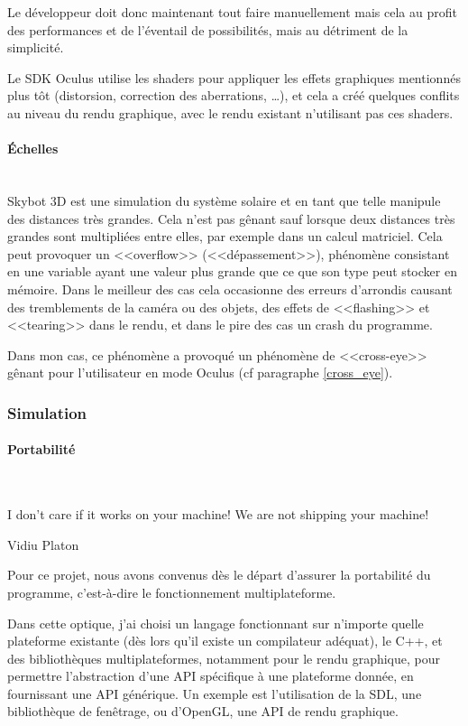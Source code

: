 \documentclass[a4paper,french,12pt]{article}
\begin{document}
		Le développeur doit donc maintenant tout faire manuellement mais cela au profit des performances et de l'éventail
		de possibilités, mais au détriment de la simplicité.
		
		Le SDK Oculus utilise les shaders pour appliquer les effets graphiques mentionnés plus tôt (distorsion, 
		correction des aberrations, \ldots), et cela a créé quelques conflits au niveau du rendu graphique, 
		avec le rendu existant n'utilisant pas ces shaders.
		
	    \paragraph{Échelles} ~\\
	      Skybot 3D est une simulation du système solaire et en tant que telle manipule des distances très grandes.
	      Cela n'est pas gênant sauf lorsque deux distances très grandes sont multipliées entre elles, par exemple
	      dans un calcul matriciel.
	      Cela peut provoquer un <<overflow>> (<<dépassement>>), phénomène consistant en une variable ayant une valeur
	      plus grande que ce que son type peut stocker en mémoire. Dans le meilleur des cas cela occasionne des 
	      erreurs d'arrondis causant des tremblements de la caméra ou des objets, des effets de <<flashing>> et
	      <<tearing>> dans le rendu, et dans le pire des cas un crash du programme.
	      
	      Dans mon cas, ce phénomène a provoqué un phénomène de <<cross-eye>> gênant pour l'utilisateur en mode
	      Oculus (cf paragraphe \ref{cross_eye}).
		
	    \subsubsection{Simulation}
		\paragraph{Portabilité} ~\\
		  \epigraph{I don’t care if it works on your machine!  We are not shipping your machine!}{Vidiu Platon}
		
		  Pour ce projet, nous avons convenus dès le départ d'assurer la portabilité du programme, c'est-à-dire
		  le fonctionnement multiplateforme.
		  
		  Dans cette optique, j'ai choisi un langage fonctionnant sur n'importe quelle plateforme existante 
		  (dès lors qu'il existe un compilateur adéquat), le C++, et
		  des bibliothèques multiplateformes, notamment pour le rendu graphique,
		  pour permettre l'abstraction d'une API spécifique à une plateforme donnée, en fournissant une API générique.
		  Un exemple est l'utilisation de la SDL, une bibliothèque de fenêtrage, ou d'OpenGL, une API de rendu
		  graphique.
		  
\end{document}
